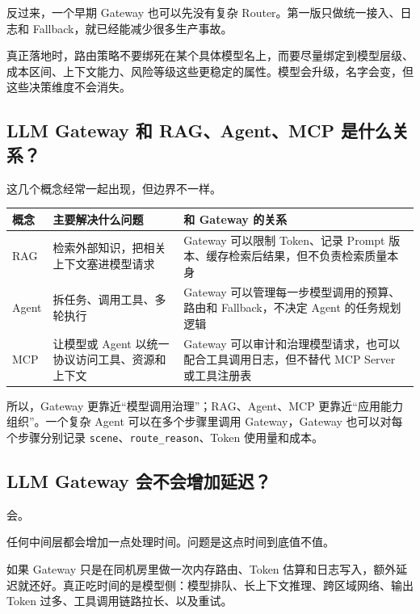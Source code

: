 \documentclass[9pt,a4paper,twocolumn]{ctexart}
\begin{document}
反过来，一个早期 Gateway 也可以先没有复杂 Router。第一版只做统一接入、日志和 Fallback，就已经能减少很多生产事故。



真正落地时，路由策略不要绑死在某个具体模型名上，而要尽量绑定到模型层级、成本区间、上下文能力、风险等级这些更稳定的属性。模型会升级，名字会变，但这些决策维度不会消失。



\subsection*{LLM Gateway 和 RAG、Agent、MCP 是什么关系？}


这几个概念经常一起出现，但边界不一样。


{\footnotesize
\begin{tabular}{|p{}|p{}|p{}|}
\hline
\textbf{概念} & \textbf{主要解决什么问题} & \textbf{和 Gateway 的关系} \\
\hline
RAG & 检索外部知识，把相关上下文塞进模型请求 & Gateway 可以限制 Token、记录 Prompt 版本、缓存检索后结果，但不负责检索质量本身 \\
\hline
Agent & 拆任务、调用工具、多轮执行 & Gateway 可以管理每一步模型调用的预算、路由和 Fallback，不决定 Agent 的任务规划逻辑 \\
\hline
MCP & 让模型或 Agent 以统一协议访问工具、资源和上下文 & Gateway 可以审计和治理模型请求，也可以配合工具调用日志，但不替代 MCP Server 或工具注册表 \\
\hline
\end{tabular}
}



所以，Gateway 更靠近“模型调用治理”；RAG、Agent、MCP 更靠近“应用能力组织”。一个复杂 Agent 可以在多个步骤里调用 Gateway，Gateway 也可以对每个步骤分别记录 \texttt{scene}、\texttt{route\_reason}、Token 使用量和成本。



\subsection*{LLM Gateway 会不会增加延迟？}


会。



任何中间层都会增加一点处理时间。问题是这点时间到底值不值。



如果 Gateway 只是在同机房里做一次内存路由、Token 估算和日志写入，额外延迟就还好。真正吃时间的是模型侧：模型排队、长上下文推理、跨区域网络、输出 Token 过多、工具调用链路拉长、以及重试。
\end{document}
